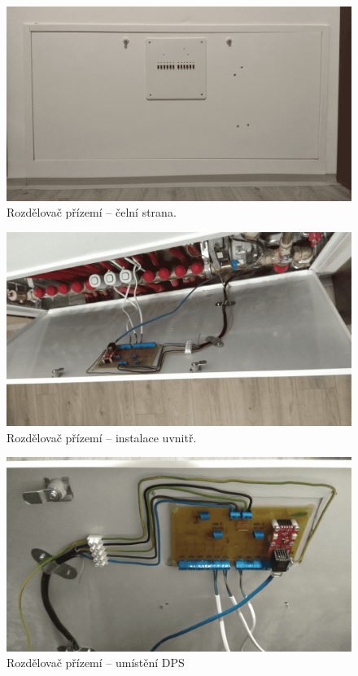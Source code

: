 \begin{figure}[H]
    \centering
    \includegraphics[width=\textwidth]{images/rozdelovac-prizemi/rozdelovac-prizemi-celni-strana.png}
    \caption{Rozdělovač přízemí – čelní strana.}
    \label{fig:rozdelovac-prizemi-celni-strana}
\end{figure}

\begin{figure}[H]
    \centering
    \includegraphics[width=\textwidth]{images/rozdelovac-prizemi/rozdelovac-prizemi.png}
    \caption{Rozdělovač přízemí – instalace uvnitř.}
    \label{fig:rozdelovac-prizemi}
\end{figure}

\begin{figure}[H]
    \centering
    \includegraphics[width=\textwidth]{images/rozdelovac-prizemi/rozdelovac-prizemi-umisteni-dps.png}
    \caption{Rozdělovač přízemí – umístění DPS}
    \label{fig:rozdelovac-prizemi-umisteni-dps}
\end{figure}
